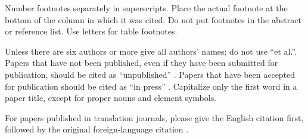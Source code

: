 \documentclass[conference]{IEEEtran}
\begin{document}
Number footnotes separately in superscripts. Place the actual footnote at
the bottom of the column in which it was cited. Do not put footnotes in the
abstract or reference list. Use letters for table footnotes.

Unless there are six authors or more give all authors' names; do not use
``et al.''. Papers that have not been published, even if they have been
submitted for publication, should be cited as ``unpublished'' \cite{b4}. Papers
that have been accepted for publication should be cited as ``in press'' \cite{b5}.
Capitalize only the first word in a paper title, except for proper nouns and
element symbols.

For papers published in translation journals, please give the English
citation first, followed by the original foreign-language citation \cite{b6}.
\end{document}

